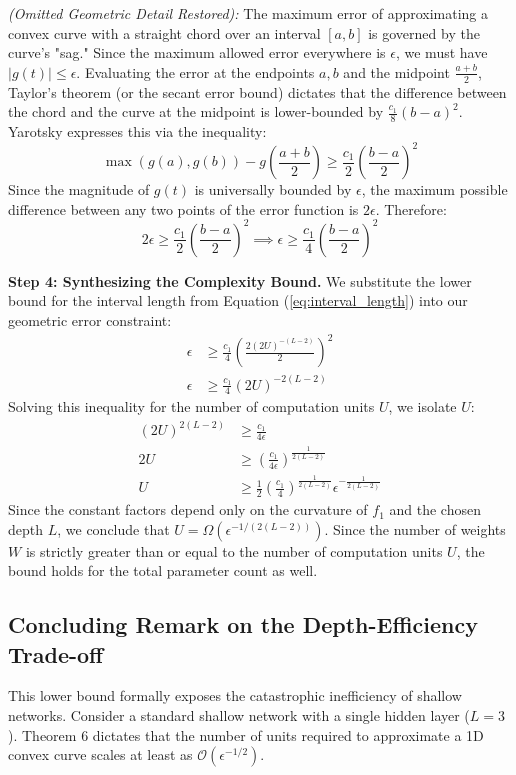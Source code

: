 \documentclass[12pt]{article}
\begin{document}
\textit{(Omitted Geometric Detail Restored):} The maximum error of approximating a convex curve with a straight chord over an interval $[a,b]$ is governed by the curve's "sag." Since the maximum allowed error everywhere is $\epsilon$, we must have $|g(t)| \le \epsilon$. Evaluating the error at the endpoints $a, b$ and the midpoint $\frac{a+b}{2}$, Taylor's theorem (or the secant error bound) dictates that the difference between the chord and the curve at the midpoint is lower-bounded by $\frac{c_1}{8}(b-a)^2$. Yarotsky expresses this via the inequality:
\begin{equation}
\max(g(a), g(b)) - g\left(\frac{a+b}{2}\right) \ge \frac{c_1}{2} \left(\frac{b-a}{2}\right)^2
\end{equation}
Since the magnitude of $g(t)$ is universally bounded by $\epsilon$, the maximum possible difference between any two points of the error function is $2\epsilon$. Therefore:
\begin{equation}
2\epsilon \ge \frac{c_1}{2} \left(\frac{b-a}{2}\right)^2 \implies \epsilon \ge \frac{c_1}{4} \left(\frac{b-a}{2}\right)^2
\end{equation}

\textbf{Step 4: Synthesizing the Complexity Bound.}
We substitute the lower bound for the interval length from Equation (\ref{eq:interval_length}) into our geometric error constraint:
\begin{align}
\epsilon &\ge \frac{c_1}{4} \left( \frac{2(2U)^{-(L-2)}}{2} \right)^2 \\
\epsilon &\ge \frac{c_1}{4} (2U)^{-2(L-2)}
\end{align}
Solving this inequality for the number of computation units $U$, we isolate $U$:
\begin{align}
(2U)^{2(L-2)} &\ge \frac{c_1}{4\epsilon} \\
2U &\ge \left( \frac{c_1}{4\epsilon} \right)^{\frac{1}{2(L-2)}} \\
U &\ge \frac{1}{2} \left( \frac{c_1}{4} \right)^{\frac{1}{2(L-2)}} \epsilon^{-\frac{1}{2(L-2)}}
\end{align}
Since the constant factors depend only on the curvature of $f_1$ and the chosen depth $L$, we conclude that $U = \Omega(\epsilon^{-1/(2(L-2))})$. Since the number of weights $W$ is strictly greater than or equal to the number of computation units $U$, the bound holds for the total parameter count as well.

\subsection{Concluding Remark on the Depth-Efficiency Trade-off}
This lower bound formally exposes the catastrophic inefficiency of shallow networks. Consider a standard shallow network with a single hidden layer ($L=3$). Theorem 6 dictates that the number of units required to approximate a 1D convex curve scales at least as $\mathcal{O}(\epsilon^{-1/2})$. 
\end{document}
